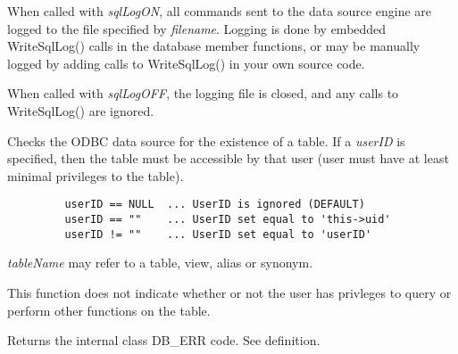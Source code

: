 
When called with {\it sqlLogON}, all commands sent to the data source engine are logged to the file specified by {\it filename}.  Logging is done by embedded WriteSqlLog() calls in the database member functions, or may be manually logged by adding calls to WriteSqlLog() in your own source code.

When called with {\it sqlLogOFF}, the logging file is closed, and any calls to WriteSqlLog() are ignored.

\label{wxdbtablexists}


Checks the ODBC data source for the existence of a table.  If a {\it userID} is specified, then the table must be accessible by that user (user must have at least minimal privileges to the table).



\begin{verbatim}
         userID == NULL  ... UserID is ignored (DEFAULT)
         userID == ""    ... UserID set equal to 'this->uid'
         userID != ""    ... UserID set equal to 'userID'
\end{verbatim}


{\it tableName} may refer to a table, view, alias or synonym.

This function does not indicate whether or not the user has privleges to query or perform other functions on the table.

\label{wxdbtranslatesqlstate}





Returns the internal class DB_ERR code.  See  definition.

